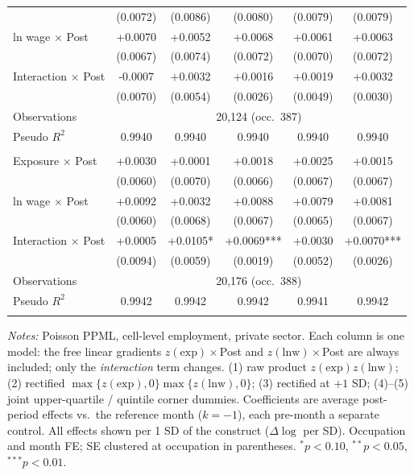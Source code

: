 \begin{table}[H]
\begin{tabular}{lccccc}
 & (0.0072) & (0.0086) & (0.0080) & (0.0079) & (0.0079) \\
ln wage $\times$ Post & +0.0070 & +0.0052 & +0.0068 & +0.0061 & +0.0063 \\
 & (0.0067) & (0.0074) & (0.0072) & (0.0070) & (0.0072) \\
Interaction $\times$ Post & -0.0007 & +0.0032 & +0.0016 & +0.0019 & +0.0032 \\
 & (0.0070) & (0.0054) & (0.0026) & (0.0049) & (0.0030) \\
\quad Observations & \multicolumn{5}{c}{20,124 \quad (occ.\ 387)} \\
\quad Pseudo $R^2$ & 0.9940 & 0.9940 & 0.9940 & 0.9940 & 0.9940 \\
\addlinespace
\multicolumn{6}{@{}l}{\textit{Panel: ages 51–60}} \\
Exposure $\times$ Post & +0.0030 & +0.0001 & +0.0018 & +0.0025 & +0.0015 \\
 & (0.0060) & (0.0070) & (0.0066) & (0.0067) & (0.0067) \\
ln wage $\times$ Post & +0.0092 & +0.0032 & +0.0088 & +0.0079 & +0.0081 \\
 & (0.0060) & (0.0068) & (0.0067) & (0.0065) & (0.0067) \\
Interaction $\times$ Post & +0.0005 & +0.0105* & +0.0069*** & +0.0030 & +0.0070*** \\
 & (0.0094) & (0.0059) & (0.0019) & (0.0052) & (0.0026) \\
\quad Observations & \multicolumn{5}{c}{20,176 \quad (occ.\ 388)} \\
\quad Pseudo $R^2$ & 0.9942 & 0.9942 & 0.9942 & 0.9941 & 0.9942 \\
\addlinespace
\bottomrule
\end{tabular}
\begin{minipage}{\linewidth}\vspace{2pt}\footnotesize
\emph{Notes:} Poisson PPML, cell-level employment, private sector. Each column is one model: the free linear gradients $z(\text{exp})\times$Post and $z(\text{lnw})\times$Post are always included; only the \emph{interaction} term changes. (1) raw product $z(\text{exp})z(\text{lnw})$; (2) rectified $\max\{z(\text{exp}),0\}\max\{z(\text{lnw}),0\}$; (3) rectified at $+1$ SD; (4)--(5) joint upper-quartile / quintile corner dummies. Coefficients are average post-period effects vs.\ the reference month ($k{=}{-}1$), each pre-month a separate control. All effects shown per 1 SD of the construct ($\Delta\log$ per SD). Occupation and month FE; SE clustered at occupation in parentheses. $^{*}p<0.10$, $^{**}p<0.05$, $^{***}p<0.01$.
\end{minipage}
\end{table}